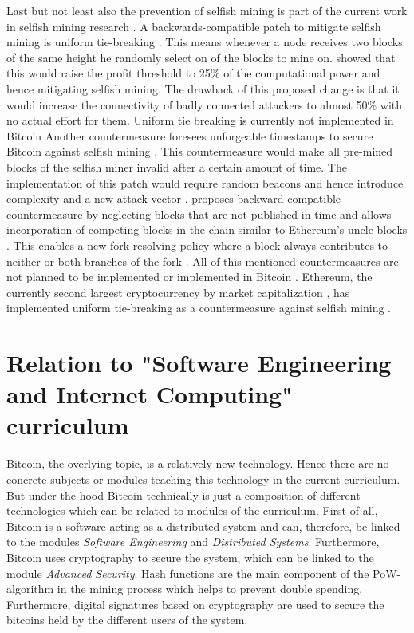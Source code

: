 \documentclass{scrartcl}
\begin{document}
Last but not least also the prevention of selfish mining is part of the current work in selfish mining research \cite{eyal2014majority, billah2015one, solat2016zeroblock, zhang2017publish}. A backwards-compatible patch to mitigate selfish mining is uniform tie-breaking \cite{eyal2014majority}. This means whenever a node receives two blocks of the same height he randomly select on of the blocks to mine on. \citep{eyal2014majority} showed that this would raise the profit threshold to 25\% of the computational power and hence mitigating selfish mining. The drawback of this proposed change is that it would increase the connectivity of badly connected attackers to almost 50\% with no actual effort for them. Uniform tie breaking is currently not implemented in Bitcoin \cite{}Another countermeasure foresees unforgeable timestamps to secure Bitcoin against selfish mining \citep{billah2015one}. This countermeasure would make all pre-mined blocks of the selfish miner invalid after a certain amount of time. The implementation of this patch would require random beacons and hence introduce complexity and a new attack vector \citep{billah2015one}. \cite{zhang2017publish} proposes backward-compatible countermeasure by neglecting blocks that are not published in time and allows incorporation of competing blocks in the chain similar to Ethereum's uncle blocks \cite{wood2014ethereum}. This enables a new fork-resolving policy where a block always contributes to neither or both branches of the fork \cite{zhang2017publish}. All of this mentioned countermeasures are not planned to be implemented or implemented in Bitcoin \cite{bitcoin, bitcoinbip}. Ethereum, the currently second largest cryptocurrency by market capitalization \cite{marketcap2017}, has implemented uniform tie-breaking as a countermeasure against selfish mining \citep{gervais2016security, unifromtiebreakingethereum}.

\section{Relation to "Software Engineering and Internet Computing" curriculum}
Bitcoin, the overlying topic, is a relatively new technology. Hence there are no concrete subjects or modules teaching this technology in the current curriculum. But under the hood Bitcoin technically is just a composition of different technologies which can be related to modules of the curriculum. First of all, Bitcoin is a software acting as a distributed system and can, therefore, be linked to the modules \textit{Software Engineering} and \textit{Distributed Systems}. Furthermore, Bitcoin uses cryptography to secure the system, which can be linked to the module \textit{Advanced Security}. Hash functions are the main component of the PoW-algorithm in the mining process which helps to prevent double spending. Furthermore, digital signatures based on cryptography are used to secure the bitcoins held by the different users of the system.
\end{document}
